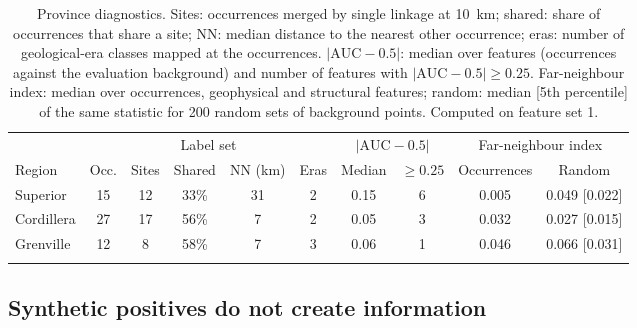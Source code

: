 \documentclass[pdflatex,sn-apa]{sn-jnl}
\begin{document}
\begin{table}[t]
\caption{Province diagnostics. Sites: occurrences merged by single linkage at 10~km; shared: share of occurrences that share a site; NN: median distance to the nearest other occurrence; eras: number of geological-era classes mapped at the occurrences. $|\mathrm{AUC}-0.5|$: median over features (occurrences against the evaluation background) and number of features with $|\mathrm{AUC}-0.5| \geq 0.25$. Far-neighbour index: median over occurrences, geophysical and structural features; random: median [5th percentile] of the same statistic for 200 random sets of background points. Computed on feature set 1.}\label{tab:region-diag}
\scriptsize
\setlength{\tabcolsep}{2.5pt}
\begin{tabular*}{\textwidth}{@{\extracolsep\fill}lccccccccc}
\toprule
 & \multicolumn{5}{c}{Label set} & \multicolumn{2}{c}{$|\mathrm{AUC}-0.5|$} & \multicolumn{2}{c}{Far-neighbour index} \\
\cmidrule(lr){2-6}\cmidrule(lr){7-8}\cmidrule(lr){9-10}
Region & Occ. & Sites & Shared & NN (km) & Eras & Median & $\geq 0.25$ & Occurrences & Random \\
\midrule
Superior & 15 & 12 & 33\% & 31 & 2 & 0.15 & 6 & 0.005 & 0.049 [0.022] \\
Cordillera & 27 & 17 & 56\% & 7 & 2 & 0.05 & 3 & 0.032 & 0.027 [0.015] \\
Grenville & 12 & 8 & 58\% & 7 & 3 & 0.06 & 1 & 0.046 & 0.066 [0.031] \\
\botrule
\end{tabular*}
\end{table}

\subsection{Synthetic positives do not create information}\label{sec:disc-gan}
\end{document}
